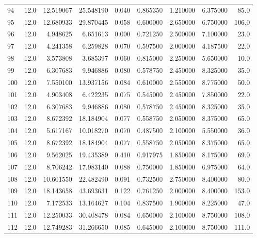 \begin{tabular}{lrrrrrrrr}
94   &   12.0 &  12.519067 &  25.548190 &  0.040 &  0.865350 &  1.210000 &   6.375000 &   85.0 \\
95   &   12.0 &  12.680933 &  29.870445 &  0.058 &  0.600000 &  2.650000 &   6.750000 &  106.0 \\
96   &   12.0 &   4.948625 &   6.651613 &  0.000 &  0.721250 &  2.500000 &   7.100000 &   23.0 \\
97   &   12.0 &   4.241358 &   6.259828 &  0.070 &  0.597500 &  2.000000 &   4.187500 &   22.0 \\
98   &   12.0 &   3.573808 &   3.685397 &  0.060 &  0.815000 &  2.250000 &   5.650000 &   10.0 \\
99   &   12.0 &   6.307683 &   9.946886 &  0.080 &  0.578750 &  2.450000 &   8.325000 &   35.0 \\
100  &   12.0 &   7.550100 &  13.937156 &  0.084 &  0.610000 &  2.550000 &   8.775000 &   50.0 \\
101  &   12.0 &   4.903408 &   6.422235 &  0.075 &  0.545000 &  2.450000 &   7.850000 &   22.0 \\
102  &   12.0 &   6.307683 &   9.946886 &  0.080 &  0.578750 &  2.450000 &   8.325000 &   35.0 \\
103  &   12.0 &   8.672392 &  18.184904 &  0.077 &  0.558750 &  2.050000 &   8.375000 &   65.0 \\
104  &   12.0 &   5.617167 &  10.018270 &  0.070 &  0.487500 &  2.100000 &   5.550000 &   36.0 \\
105  &   12.0 &   8.672392 &  18.184904 &  0.077 &  0.558750 &  2.050000 &   8.375000 &   65.0 \\
106  &   12.0 &   9.562025 &  19.435389 &  0.410 &  0.917975 &  1.850000 &   8.175000 &   69.0 \\
107  &   12.0 &   8.706242 &  17.983140 &  0.088 &  0.750000 &  1.850000 &   6.975000 &   64.0 \\
108  &   12.0 &  10.601550 &  22.482490 &  0.091 &  0.732500 &  2.750000 &   8.400000 &   80.0 \\
109  &   12.0 &  18.143658 &  43.693631 &  0.122 &  0.761250 &  2.000000 &   8.400000 &  153.0 \\
110  &   12.0 &   7.172533 &  13.164627 &  0.104 &  0.837500 &  1.900000 &   8.225000 &   47.0 \\
111  &   12.0 &  12.250033 &  30.408478 &  0.084 &  0.650000 &  2.100000 &   8.750000 &  108.0 \\
112  &   12.0 &  12.749283 &  31.266650 &  0.085 &  0.645000 &  2.100000 &   8.750000 &  111.0 \\

\end{tabular}
